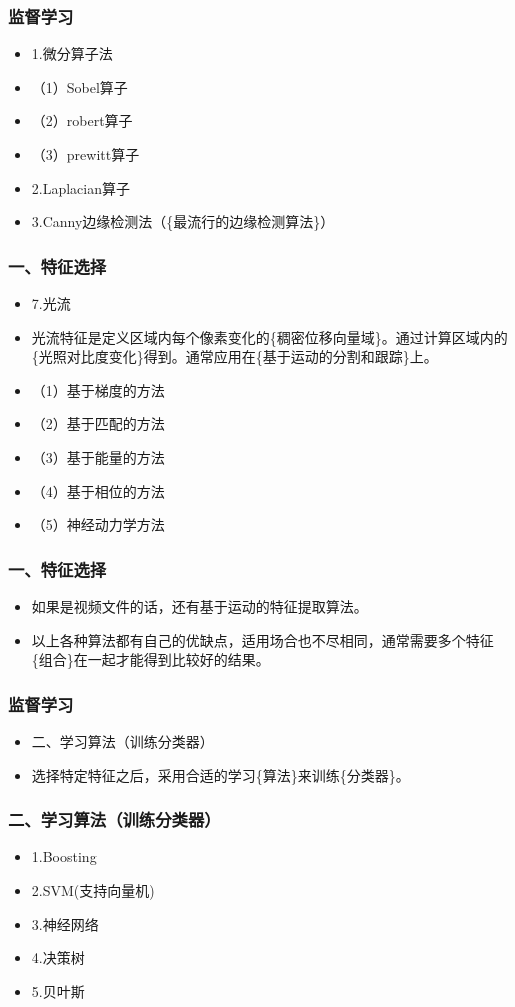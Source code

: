 \documentclass[notheorems,mathserif,table,compress]{beamer}  %
\begin{document}
\begin{frame}
  \frametitle{监督学习}  
  \begin{itemize}
  \item 1.微分算子法
  \item（1）Sobel算子 
  \item（2）robert算子
  \item（3）prewitt算子
  \item 2.Laplacian算子
  \item 3.Canny边缘检测法（\{最流行的边缘检测算法\}）
  \end{itemize}
\end{frame}

\begin{frame}
  \frametitle{一、特征选择}
  \begin{itemize}
  \item 7.光流
  \item 光流特征是定义区域内每个像素变化的\{稠密位移向量域\}。通过计算区域内的\{光照对比度变化\}得到。通常应用在\{基于运动的分割和跟踪\}上。
  \item（1）基于梯度的方法
  \item（2）基于匹配的方法
  \item（3）基于能量的方法 
  \item（4）基于相位的方法
  \item（5）神经动力学方法
  \end{itemize}
\end{frame}

\begin{frame}
  \frametitle{一、特征选择}
  \begin{itemize}
  \item 如果是视频文件的话，还有基于运动的特征提取算法。
  \item 以上各种算法都有自己的优缺点，适用场合也不尽相同，通常需要多个特征\{组合\}在一起才能得到比较好的结果。
  \end{itemize}
\end{frame}


\begin{frame}
  \frametitle{监督学习}
  \begin{itemize}
  \item 二、学习算法（训练分类器）
  \item 选择特定特征之后，采用合适的学习\{算法\}来训练\{分类器\}。
  \end{itemize}
\end{frame}

\begin{frame}
  \frametitle{二、学习算法（训练分类器）}
  \begin{itemize}
  \item 1.Boosting
  \item 2.SVM(支持向量机)
  \item 3.神经网络
  \item 4.决策树
  \item 5.贝叶斯
  \end{itemize}
\end{frame}
\end{document}
